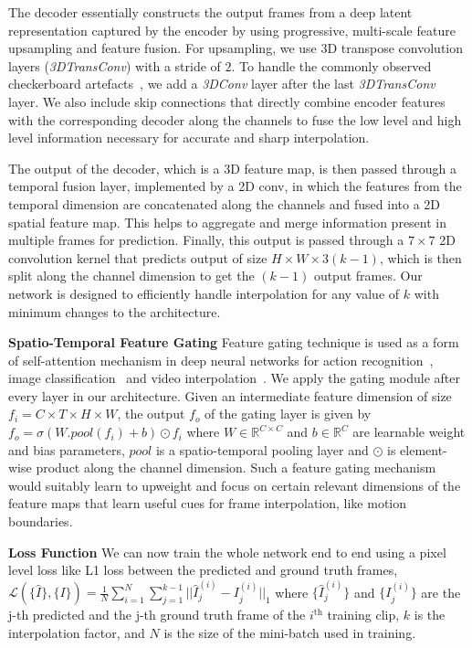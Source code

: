 \documentclass[10pt,twocolumn,letterpaper]{article}
\newcommand{\I}{\hat{I}}
\newcommand{\LL}{\mathcal{L}}
\newcommand{\stimes}{{\times}}
\begin{document}
The decoder essentially constructs the output frames from a deep latent representation captured by the encoder by using progressive, multi-scale feature upsampling and feature fusion. For upsampling, we use 3D transpose convolution layers (\textit{3DTransConv}) with a stride of $2$. To handle the commonly observed checkerboard artefacts~\cite{odena2016deconvolution}, we add a \textit{3DConv} layer after the last \textit{3DTransConv} layer. We also include skip connections that directly combine encoder features with the corresponding decoder along the channels to fuse the low level and high level information necessary for accurate and sharp interpolation.

The output of the decoder, which is a 3D feature map, is then passed through a temporal fusion layer, implemented by a 2D conv, in which the features from the temporal dimension are concatenated along the channels and fused into a 2D spatial feature map. This helps to aggregate and merge information present in multiple frames for prediction. Finally, this output is passed through a $7 \stimes 7$ 2D convolution kernel that predicts output of size $H \stimes W \stimes 3(k{-}1)$, which is then split along the channel dimension to get the $(k{-}1)$ output frames. Our network is designed to efficiently handle interpolation for any value of $k$ with minimum changes to the architecture.

{\bf Spatio-Temporal Feature Gating} Feature gating technique is used as a form of self-attention mechanism in deep neural networks for action recognition~\cite{miech2017learnable,xie2018rethinking}, image classification~\cite{hu2018squeeze} and video interpolation~\cite{choi2020channel}. We apply the gating module after every layer in our architecture. Given an intermediate feature dimension of size $f_{i} = C \stimes T \stimes H \stimes W$, the output $f_{o}$ of the gating layer is given by
$
    f_{o} = \sigma(W . pool(f_{i}) + b) \odot f_i
$
where $W \in \mathbb{R}^{C \stimes C}$ and $b \in  \mathbb{R}^{C}$ are learnable weight and bias parameters, $pool$ is a spatio-temporal pooling layer and $\odot$ is element-wise product along the channel dimension. Such a feature gating mechanism would suitably learn to upweight and focus on certain relevant dimensions of the feature maps that learn useful cues for frame interpolation, like motion boundaries.

{\bf Loss Function} We can now train the whole network end to end using a pixel level loss like L1 loss between the predicted and ground truth frames, 
$
    \LL(\{\I\} , \{I\}) {=} \frac{1}{N} \sum_{i=1}^N \sum_{j=1}^{k-1} || \I_j^{(i)} - I_j^{(i)} ||_1
$
\noindent where $\{\I_j^{(i)}\}$ and $\{I_j^{(i)}\}$ are the j-th predicted and the j-th ground truth frame of the $i^{\text{th}}$ training clip, $k$ is the interpolation factor, and $N$ is the size of the mini-batch used in training. 
\end{document}
